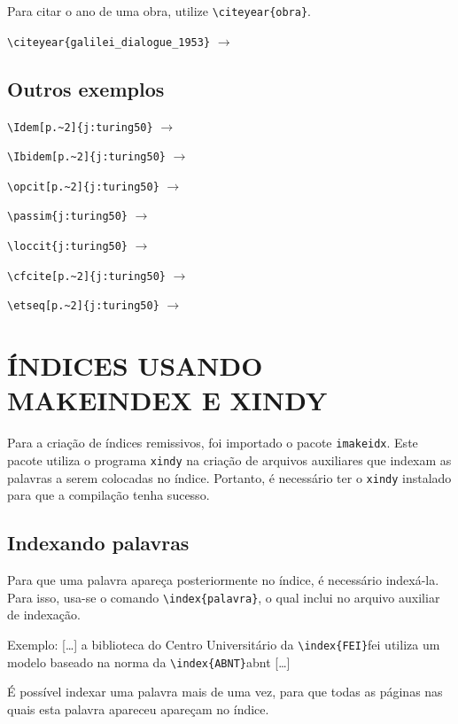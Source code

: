 \documentclass{fei}
\begin{document}
	Para citar o ano de uma obra, utilize \verb+\citeyear{obra}+.
	
	\verb+\citeyear{galilei_dialogue_1953}+ \(\to\) \citeyear{galilei_dialogue_1953}

	\section{Outros exemplos}

	\verb++ \(\to\) \Idem[p.~2]{j:turing50}

	\verb++ \(\to\) \Ibidem[p.~2]{j:turing50}

	\verb++ \(\to\) \opcit[p.~2]{j:turing50}

	\verb++ \(\to\) \passim{j:turing50}

	\verb++ \(\to\) \loccit{j:turing50}

	\verb++ \(\to\) \cfcite[p.~2]{j:turing50}

	\verb++ \(\to\) \etseq[p.~2]{j:turing50}

	\chapter{ÍNDICES USANDO MAKEINDEX E XINDY}\label{chap:indice}
	
	Para a criação de índices remissivos, foi importado o pacote \texttt{imakeidx}. Este pacote utiliza o programa \texttt{xindy} na criação de arquivos auxiliares que indexam as palavras a serem colocadas no índice. Portanto, é necessário ter o \texttt{xindy} instalado para que a compilação tenha sucesso.
	
	\section{Indexando palavras}
	
	Para que uma palavra apareça posteriormente no índice, é necessário indexá-la. Para isso, usa-se o comando \verb+\index{palavra}+, o qual inclui  no arquivo auxiliar de indexação.

	Exemplo: [\ldots] a biblioteca do Centro Universitário da \verb+\index{FEI}+\gls{fei} utiliza um modelo baseado na norma da \verb+\index{ABNT}+\gls{abnt} [\ldots]
	
	É possível indexar uma palavra mais de uma vez, para que todas as páginas nas quais esta palavra apareceu apareçam no índice.
	
\end{document}
